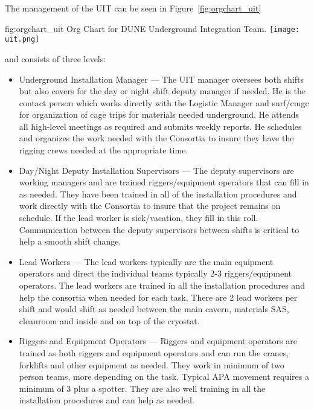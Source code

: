The management of the UIT can be seen in Figure~\ref{fig:orgchart_uit}
\begin{dunefigure}{fig:orgchart_uit}
  {Org Chart for DUNE Underground Integration Team.}
  \texttt{[image: uit.png]}
\end{dunefigure}
and consists of three levels:
\begin{itemize}
  \item Underground Installation Manager --- The UIT manager oversees
    both shifts but also covers for the day or night shift deputy
    manager if needed.  He is the contact person which works directly
    with the Logistic Manager and {surf}/{cmgc} for organization of cage
    trips for materials needed underground.  He attends all high-level
    meetings as required and submits weekly reports.  He schedules and
    organizes the work needed with the Consortia to insure they have
    the rigging crews needed at the appropriate time.
  \item Day/Night Deputy Installation Supervisors --- The deputy
      supervisors are working managers and are trained
      riggers/equipment operators that can fill in as needed.  They
      have been trained in all of the installation procedures and work
      directly with the Consortia to insure that the project remains
      on schedule.  If the lead worker is sick/vacation, they fill in
      this roll. Communication between the deputy supervisors between
      shifts is critical to help a smooth shift change.
  \item Lead Workers --- The lead workers typically are the main
    equipment operators and direct the individual teams typically 2-3
    riggers/equipment operators.  The lead workers are trained in all
    the installation procedures and help the consortia when needed for
    each task.  There are 2 lead workers per shift and would shift as
    needed between the main cavern, materials SAS, cleanroom and
    inside and on top of the cryostat.
  \item Riggers and Equipment Operators --- Riggers and equipment
    operators are trained as both riggers and equipment operators and
    can run the cranes, forklifts and other equipment as needed.  They
    work in minimum of two person teams, more depending on the
    task. Typical APA movement requires a minimum of 3 plus a
    spotter. They are also well training in all the installation
    procedures and can help as needed.
\end{itemize}


